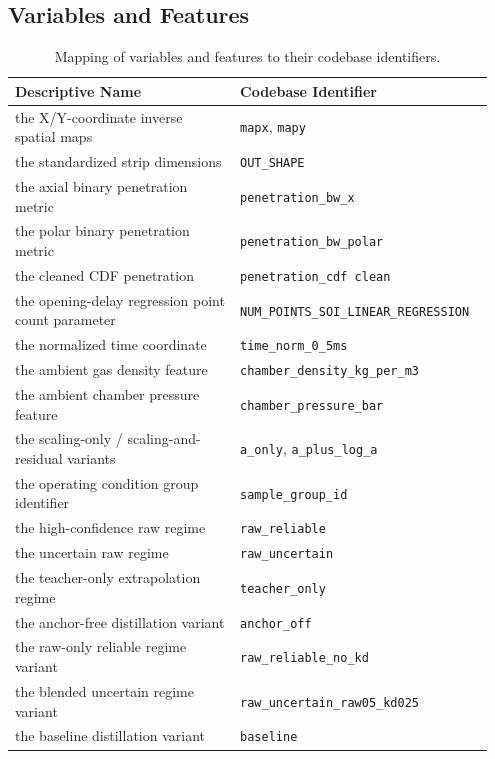 \documentclass[english, 12pt, a4paper, elec, utf8, a-2b, online]{aaltothesis}
\begin{document}
\subsection{Variables and Features}

\begin{table}[h]
\centering
\begin{tabular}{p{0.45\linewidth} p{0.5\linewidth}}
\toprule
\textbf{Descriptive Name} & \textbf{Codebase Identifier} \\
\midrule
the X/Y-coordinate inverse spatial maps & \texttt{mapx}, \texttt{mapy} \\
the standardized strip dimensions & \texttt{OUT\_SHAPE} \\
the axial binary penetration metric & \texttt{penetration\_bw\_x} \\
the polar binary penetration metric & \texttt{penetration\_bw\_polar} \\
the cleaned CDF penetration & \texttt{penetration\_cdf clean} \\
the opening-delay regression point count parameter & \texttt{NUM\_POINTS\_SOI\_LINEAR\_REGRESSION} \\
the normalized time coordinate & \texttt{time\_norm\_0\_5ms} \\
the ambient gas density feature & \texttt{chamber\_density\_kg\_per\_m3} \\
the ambient chamber pressure feature & \texttt{chamber\_pressure\_bar} \\
the scaling-only / scaling-and-residual variants & \texttt{a\_only}, \texttt{a\_plus\_log\_a} \\
the operating condition group identifier & \texttt{sample\_group\_id} \\
the high-confidence raw regime & \texttt{raw\_reliable} \\
the uncertain raw regime & \texttt{raw\_uncertain} \\
the teacher-only extrapolation regime & \texttt{teacher\_only} \\
the anchor-free distillation variant & \texttt{anchor\_off} \\
the raw-only reliable regime variant & \texttt{raw\_reliable\_no\_kd} \\
the blended uncertain regime variant & \texttt{raw\_uncertain\_raw05\_kd025} \\
the baseline distillation variant & \texttt{baseline} \\
\bottomrule
\end{tabular}
\caption{Mapping of variables and features to their codebase identifiers.}
\end{table}
\end{document}
